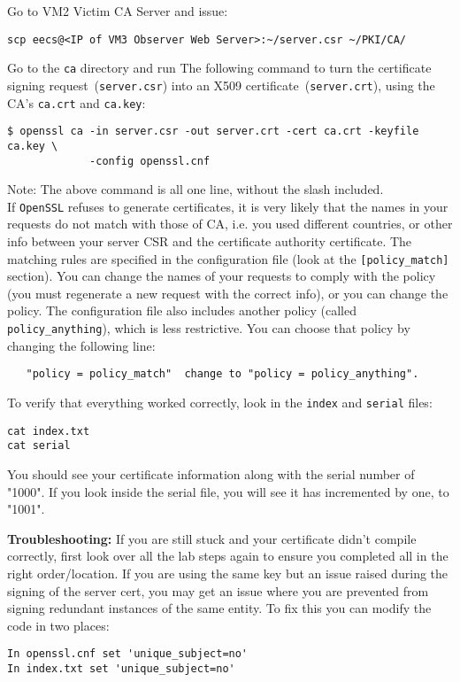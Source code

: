 \documentclass{article}
\begin{document}
Go to VM2 Victim CA Server and issue:

\begin{verbatim}
scp eecs@<IP of VM3 Observer Web Server>:~/server.csr ~/PKI/CA/
\end{verbatim}

Go to the {\tt ca} directory and run The following command to turn the 
certificate signing request~({\tt server.csr}) into 
an X509 certificate~({\tt server.crt}), using the CA's
{\tt ca.crt} and {\tt ca.key}:

\begin{verbatim}
$ openssl ca -in server.csr -out server.crt -cert ca.crt -keyfile ca.key \
             -config openssl.cnf
\end{verbatim}

Note: The above command is all one line, without the slash included.
\\

If {\tt OpenSSL} refuses to generate certificates, it is very likely that
the names in your requests do not match with those of CA, i.e. you used different countries, or other info between your server CSR and the certificate authority certificate. The matching
rules are specified in the configuration file (look at 
the {\tt [policy\_match]} section). You can change the names of your 
requests to comply with the policy (you must regenerate a new request with the correct info), or you can change the 
policy.  The configuration file 
also includes another policy (called {\tt policy\_anything}), 
which is less restrictive. You can choose that policy by
changing the following line: 
\begin{verbatim}
   "policy = policy_match"  change to "policy = policy_anything".
\end{verbatim} 

To verify that everything worked correctly, look in the {\tt index} and {\tt serial} files:
\begin{verbatim}
cat index.txt
cat serial
\end{verbatim}

You should see your certificate information along with the serial number of "1000". If you look inside the serial file, you will see it has incremented by one, to "1001". 

\textbf{Troubleshooting:} If you are still stuck and your certificate didn't compile correctly, first look over all the lab steps again to ensure you completed all in the right order/location. If you are using the same key but an issue raised during the signing of the server cert, you may get an issue where you are prevented from signing redundant instances of the same entity. To fix this you can modify the code in two places:
\begin{verbatim}
In openssl.cnf set 'unique_subject=no'
In index.txt set 'unique_subject=no'
\end{verbatim}
\end{document}

